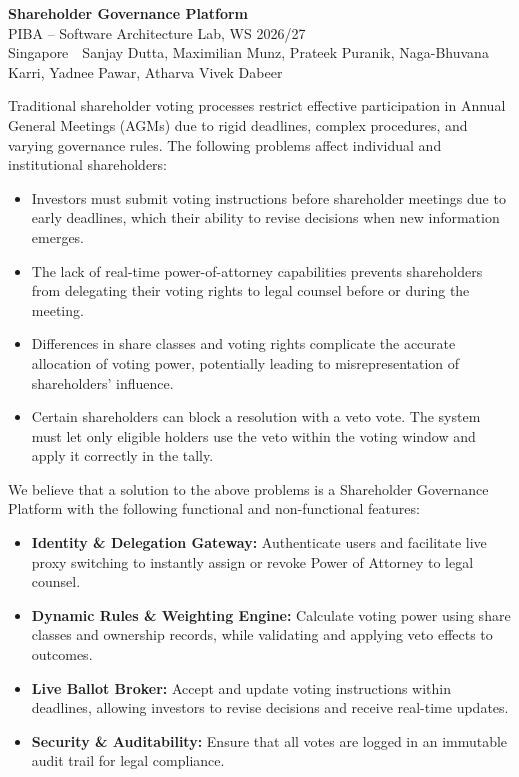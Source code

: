 \documentclass[11pt,a4paper]{article}
\newcommand{\pibapart}[1]{\vspace{0.4em}{\large\textbf{#1}}\par}
\newcommand{\projecttitle}{{Shareholder Governance Platform}}
\newcommand{\teamname}{ {Singapore}}
\newcommand{\teammembers}{{Sanjay Dutta, Maximilian Munz, Prateek Puranik, Naga-Bhuvana Karri, Yadnee Pawar, Atharva Vivek Dabeer}}
\begin{document}
\begin{center}
  {\LARGE\textbf{\projecttitle}}\\[0.4em]
  {\large PIBA -- Software Architecture Lab, WS 2026/27}\\[0.3em]
  \teamname\ \textbullet\ \teammembers
\end{center}

\pibapart{Problem}
Traditional shareholder voting processes restrict effective participation in Annual General Meetings (AGMs) due to rigid deadlines, complex procedures, and varying governance rules. The following problems affect individual and institutional shareholders:

\begin{itemize}
  \item Investors must submit voting instructions before shareholder meetings due to early deadlines, which their ability to revise decisions when new information emerges.
  \item The lack of real-time power-of-attorney capabilities prevents shareholders from delegating their voting rights to legal counsel before or during the meeting.
  \item Differences in share classes and voting rights complicate the accurate allocation of voting power, potentially leading to misrepresentation of shareholders' influence.
  \item Certain shareholders can block a resolution with a veto vote. The system must let only eligible holders use the veto within the voting window and apply it correctly in the tally.
\end{itemize}

\pibapart{Idea}
We believe that a solution to the above problems is a Shareholder Governance Platform with the following functional and non-functional features:

\begin{itemize}
  \item \textbf{Identity \& Delegation Gateway:} Authenticate users and facilitate live proxy switching to instantly assign or revoke Power of Attorney to legal counsel.
  \item \textbf{Dynamic Rules \& Weighting Engine:} Calculate voting power using share classes and ownership records, while validating and applying veto effects to outcomes.
  \item \textbf{Live Ballot Broker:} Accept and update voting instructions within deadlines, allowing investors to revise decisions and receive real-time updates.
  \item \textbf{Security \& Auditability:} Ensure that all votes are logged in an immutable audit trail for legal compliance.
\end{itemize}
\end{document}
